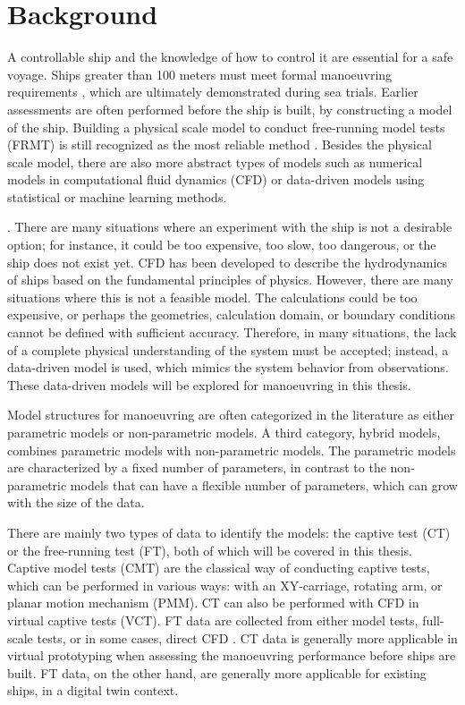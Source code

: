 \section{Background}
A controllable ship and the knowledge of how to control it are essential for a safe voyage. Ships greater than 100 meters must meet formal manoeuvring requirements \cite{imoStandardsShipManoeuvrability2002}, which are ultimately demonstrated during sea trials. Earlier assessments are often performed before the ship is built, by constructing a model of the ship. Building a physical scale model to conduct free-running model tests (FRMT) is still recognized as the most reliable method \cite{ittcManeuveringCommitteeITTC2008}. Besides the physical scale model, there are also more abstract types of models such as numerical models in computational fluid dynamics (CFD) or data-driven models using statistical or machine learning methods.

 \cite{ljungModelingIdentificationDynamic2021}. There are many situations where an experiment with the ship is not a desirable option; for instance, it could be too expensive, too slow, too dangerous, or the ship does not exist yet. CFD has been developed to describe the hydrodynamics of ships based on the fundamental principles of physics. However, there are many situations where this is not a feasible model. The calculations could be too expensive, or perhaps the geometries, calculation domain, or boundary conditions cannot be defined with sufficient accuracy. Therefore, in many situations, the lack of a complete physical understanding of the system must be accepted; instead, a data-driven model is used, which mimics the system behavior from observations. These data-driven models will be explored for manoeuvring in this thesis.

Model structures for manoeuvring are often categorized in the literature as either parametric models or non-parametric models. A third category, hybrid models, combines parametric models with non-parametric models. 
The parametric models are characterized by a fixed number of parameters, in contrast to the non-parametric models that can have a flexible number of parameters, which can grow with the size of the data. 

There are mainly two types of data to identify the models: the captive test (CT) or the free-running test (FT), both of which will be covered in this thesis. Captive model tests (CMT) are the classical way of conducting captive tests, which can be performed in various ways: with an XY-carriage, rotating arm, or planar motion mechanism (PMM). CT can also be performed with CFD in virtual captive tests (VCT). FT data are collected from either model tests, full-scale tests, or in some cases, direct CFD \cite{arakiEstimatingManeuveringCoefficients2012}. CT data is generally more applicable in virtual prototyping when assessing the manoeuvring performance before ships are built. FT data, on the other hand, are generally more applicable for existing ships, in a digital twin context.

